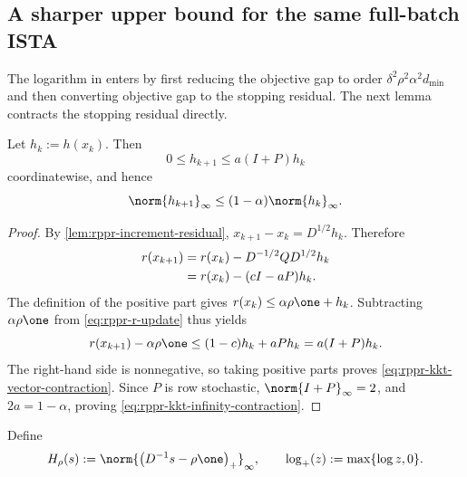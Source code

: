 \subsection{A sharper upper bound for the same full-batch ISTA}
\label{subsec:rppr-sharp-batch-upper}

The logarithm in \citet[Theorem~3]{fountoulakis2019variational} enters by
first reducing the objective gap to order
\(\delta^2\rho^2\alpha^2d_{\min}\) and then converting objective gap to the
stopping residual.  The next lemma contracts the stopping residual directly.

\begin{lemma}
\label{lem:rppr-kkt-contraction}
Let \(h_k:=h(x_k)\).  Then
\begin{equation}
    0\leq h_{k+1}\leq a(I+P)h_k
    \label{eq:rppr-kkt-vector-contraction}
\end{equation}
coordinatewise, and hence
\begin{equation}
    \norm{h_{k+1}}_\infty
    \leq(1-\alpha)\norm{h_k}_\infty.
    \label{eq:rppr-kkt-infinity-contraction}
\end{equation}
\end{lemma}

\begin{proof}
By \cref{lem:rppr-increment-residual},
\(x_{k+1}-x_k=D^{1/2}h_k\).  Therefore
\begin{align}
    r(x_{k+1})
    &=r(x_k)-D^{-1/2}QD^{1/2}h_k \notag\\
    &=r(x_k)-(cI-aP)h_k.
    \label{eq:rppr-r-update}
\end{align}
The definition of the positive part gives
\(r(x_k)\leq\alpha\rho\one+h_k\).  Subtracting
\(\alpha\rho\one\) from \cref{eq:rppr-r-update} thus yields
\[
    r(x_{k+1})-\alpha\rho\one
    \leq
    (1-c)h_k+aPh_k
    =a(I+P)h_k.
\]
The right-hand side is nonnegative, so taking positive parts proves
\cref{eq:rppr-kkt-vector-contraction}.  Since \(P\) is row stochastic,
\(\norm{I+P}_{\infty}=2\), and \(2a=1-\alpha\), proving
\cref{eq:rppr-kkt-infinity-contraction}.
\end{proof}

Define
\begin{equation}
    H_\rho(s)
    :=
    \norm{\bigl(D^{-1}s-\rho\one\bigr)_+}_\infty,
    \qquad
    \log_+(z):=\max\{\log z,0\}.
    \label{eq:rppr-H-definition}
\end{equation}

